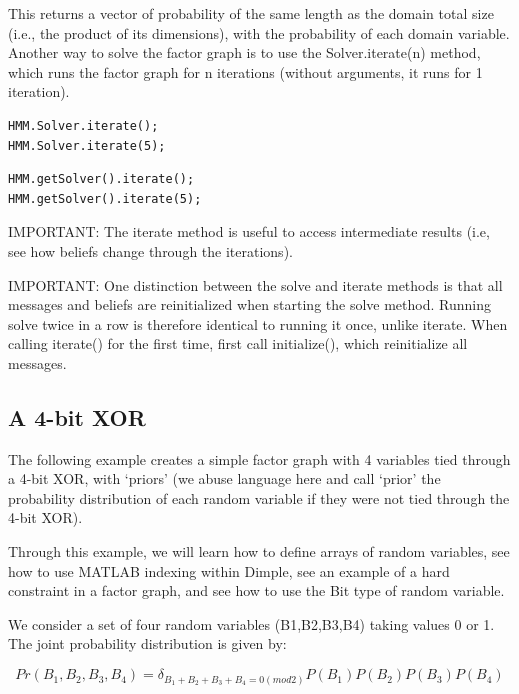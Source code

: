 This returns a vector of probability of the same length as the domain total size (i.e., the product of its dimensions), with the probability of each domain variable.
Another way to solve the factor graph is to use the Solver.iterate(n) method, which runs the factor graph for n iterations (without arguments, it runs for 1 iteration).

\ifmatlab

\begin{lstlisting}
HMM.Solver.iterate();
HMM.Solver.iterate(5);
\end{lstlisting}

\fi

\ifjava

\begin{lstlisting}
HMM.getSolver().iterate();
HMM.getSolver().iterate(5);
\end{lstlisting}

\fi

IMPORTANT: The iterate method is useful to access intermediate results (i.e, see how beliefs change through the iterations).

IMPORTANT: One distinction between the solve and iterate methods is that all messages and beliefs are reinitialized when starting the solve method. Running solve twice in a row is therefore identical to running it once, unlike iterate.  When calling iterate() for the first time, first call initialize(), which reinitialize all messages.


\subsection{A 4-bit XOR}

The following example creates a simple factor graph with 4 variables tied through a 4-bit XOR, with `priors' (we abuse language here and call `prior' the probability distribution of each random variable if they were not tied through the 4-bit XOR).

Through this example, we will learn how to define arrays of random variables, see how to use MATLAB indexing within Dimple, see an example of a hard constraint in a factor graph, and see how to use the Bit type of random variable.

We consider a set of four random variables (B1,B2,B3,B4) taking values 0 or 1. The joint probability distribution is given by:


\[
 Pr(B_1,B_2,B_3,B_4) = \delta_{B_1+B_2+B_3+B_4=0(mod2)}  P(B_1)P(B_2)P(B_3)P(B_4)  
\]


